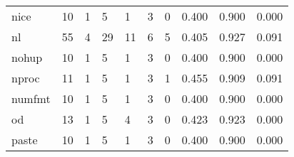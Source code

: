 \begin{longtable}{lp{2.0cm}p{2.0cm}p{2.0cm}p{2.0cm}p{2.0cm}p{2.0cm}p{2.0cm}p{2.0cm}p{2.0cm}}
nice      &                     10 &                                             1 &                                            5 &                                           1 &                                            3 &                                          0 &                                0.400 &                                  0.900 &                                0.000 \\
nl        &                     55 &                                             4 &                                           29 &                                          11 &                                            6 &                                          5 &                                0.405 &                                  0.927 &                                0.091 \\
nohup     &                     10 &                                             1 &                                            5 &                                           1 &                                            3 &                                          0 &                                0.400 &                                  0.900 &                                0.000 \\
nproc     &                     11 &                                             1 &                                            5 &                                           1 &                                            3 &                                          1 &                                0.455 &                                  0.909 &                                0.091 \\
numfmt    &                     10 &                                             1 &                                            5 &                                           1 &                                            3 &                                          0 &                                0.400 &                                  0.900 &                                0.000 \\
od        &                     13 &                                             1 &                                            5 &                                           4 &                                            3 &                                          0 &                                0.423 &                                  0.923 &                                0.000 \\
paste     &                     10 &                                             1 &                                            5 &                                           1 &                                            3 &                                          0 &                                0.400 &                                  0.900 &                                0.000 \\

\end{longtable}
